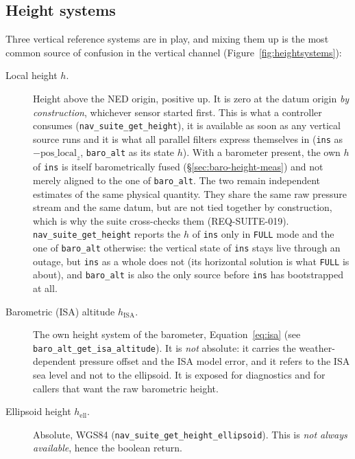 \documentclass[11pt,a4paper]{article}
\newcommand{\code}[1]{\texttt{#1}}
\begin{document}
\subsection{Height systems}
\label{sec:heightsystems}

Three vertical reference systems are in play, and mixing them up is the
most common source of confusion in the vertical channel
(Figure~\ref{fig:heightsystems}):

\begin{description}
\item[Local height $h$.] Height above the NED origin, positive up. It is zero
  at the datum origin \emph{by construction}, whichever sensor started
  first. This is what a controller consumes
  (\code{nav\_\allowbreak{}suite\_\allowbreak{}get\_\allowbreak{}height}), it is available as soon as any
  vertical source runs and it is what all parallel filters express
  themselves in (\code{ins} as $-\text{pos\_local}_z$, \code{baro\_\allowbreak{}alt}
  as its state $h$). With a barometer present, the own $h$ of \code{ins} is
  itself barometrically fused (\S\ref{sec:baro-height-meas}) and not merely
  aligned to the one of \code{baro\_\allowbreak{}alt}. The two remain independent estimates
  of the same physical quantity. They share the same raw pressure stream and
  the same datum, but are not tied together by construction, which is why the
  suite cross-checks them (REQ-SUITE-019). \code{nav\_\allowbreak{}suite\_\allowbreak{}get\_\allowbreak{}height}
  reports the $h$ of \code{ins} only in \code{FULL} mode and the one of
  \code{baro\_\allowbreak{}alt} otherwise: the vertical state of \code{ins} stays live
  through an outage, but \code{ins} as a whole does not (its horizontal
  solution is what \code{FULL} is about), and \code{baro\_\allowbreak{}alt} is also
  the only source before \code{ins} has bootstrapped at all.
\item[Barometric (ISA) altitude $h_{\text{ISA}}$.] The own height system of the
  barometer, Equation~\eqref{eq:isa} (see
  \code{baro\_\allowbreak{}alt\_\allowbreak{}get\_\allowbreak{}isa\_\allowbreak{}altitude}). It is \emph{not} absolute: it
  carries the weather-dependent pressure offset and the ISA model error,
  and it refers to the ISA sea level and not to the ellipsoid. It is exposed for
  diagnostics and for callers that want the raw barometric height.
\item[Ellipsoid height $h_{\text{ell}}$.] Absolute, WGS84
  (\code{nav\_\allowbreak{}suite\_\allowbreak{}get\_\allowbreak{}height\_\allowbreak{}ellipsoid}). This
  is \emph{not always available}, hence the boolean return.
\end{description}
\end{document}
